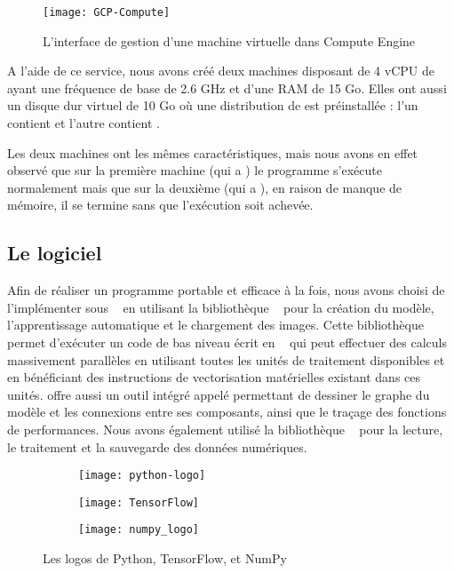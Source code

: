 \begin{figure}[h]
  \centering
  \texttt{[image: GCP-Compute]}
  \caption{L'interface de gestion d'une machine virtuelle dans Compute Engine}
\end{figure}

A l'aide de ce service, nous avons créé deux machines disposant de 4 vCPU
de  ayant une fréquence de base de 2.6 GHz et d'une
RAM de 15 Go. Elles ont aussi un disque dur virtuel de 10 Go où une distribution
de  est préinstallée : l'un contient  et l'autre
contient .

Les deux machines ont les mêmes caractéristiques, mais nous avons en effet
observé que sur la première machine (qui a ) le programme s'exécute
normalement mais que sur la deuxième (qui a ), en raison de manque
de mémoire, il se termine sans que l'exécution soit achevée.

\subsection{Le logiciel}

Afin de réaliser un programme portable et efficace à la fois, nous avons choisi
de l'implémenter sous ~\cite{python3} en utilisant la bibliothèque ~\cite{DBLP:journals/corr/AbadiABBCCCDDDG16}
pour la création du modèle, l'apprentissage automatique et le chargement des images.
Cette bibliothèque permet d'exécuter un code de bas niveau écrit en ~\cite{stroustrup1995c++}
qui peut effectuer des calculs massivement parallèles en utilisant toutes les unités
de traitement disponibles et en bénéficiant des instructions de vectorisation matérielles
existant dans ces unités.  offre aussi un outil intégré
appelé  permettant de dessiner le graphe du modèle et les
connexions entre ses composants, ainsi que le traçage des fonctions de performances.
Nous avons également utilisé la bibliothèque ~\cite{walt2011numpy} pour la lecture,
le traitement et la sauvegarde des données numériques.

\begin{figure}[h]
\centering
\begin{subfigure}{0.3\textwidth}\texttt{[image: python-logo]}\end{subfigure}
\begin{subfigure}{0.3\textwidth}\texttt{[image: TensorFlow]}\end{subfigure}
\begin{subfigure}{0.3\textwidth}\texttt{[image: numpy\_logo]}\end{subfigure}
\caption{Les logos de Python, TensorFlow, et NumPy}
\end{figure}


